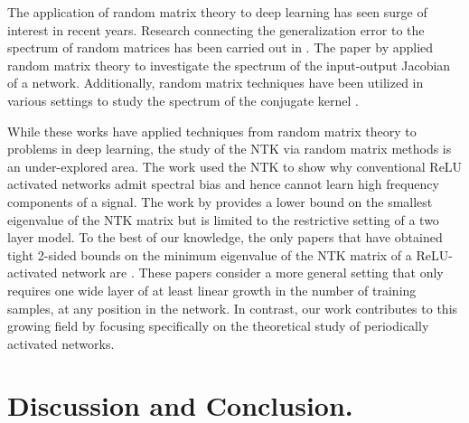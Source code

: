 \documentclass{article}
\theoremstyle{plain}
\theoremstyle{definition}
\theoremstyle{remark}
\begin{document}
The application of random matrix theory to deep learning has seen surge of interest in recent years. Research connecting the generalization error to the spectrum of random matrices has been carried out in \cite{hastie2022surprises, gerace2020generalisation, liao2020random, montanari2022interpolation}. The paper by \cite{pennington2018emergence} applied random matrix theory to investigate the spectrum of the input-output Jacobian of a network. Additionally, random matrix techniques have been utilized in various settings to study the spectrum of the conjugate kernel \cite{pennington2017nonlinear, liao2018spectrum}.

While these works have applied techniques from random matrix theory to problems in deep learning, the study of the NTK via random matrix methods is an under-explored area. The work \cite{tancik2020fourier} used the NTK to show why conventional ReLU activated networks admit spectral bias and hence cannot learn high frequency components of a signal.
The work by \cite{montanari2022interpolation} provides a lower bound on the smallest eigenvalue of the NTK matrix but is limited to the restrictive setting of a two layer model. To the best of our knowledge, the only papers that have obtained tight 2-sided bounds on the minimum eigenvalue of the NTK matrix of a ReLU-activated network are \cite{nguyen2021tight, nguyen2020global}. These papers consider a more general setting that only requires one wide layer of at least linear growth in the number of training samples, at any position in the network. In contrast, our work contributes to this growing field by focusing specifically on the theoretical study of periodically activated networks.


\section{Discussion and Conclusion.}

\end{document}
